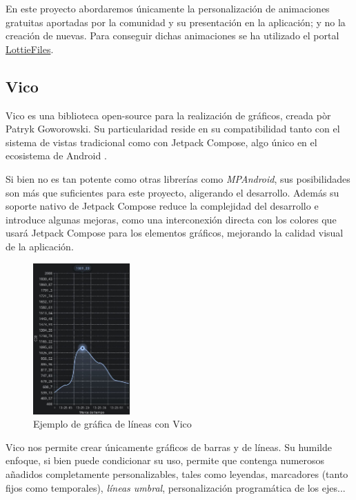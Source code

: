             En este proyecto abordaremos únicamente la personalización de animaciones gratuitas aportadas por la 
            comunidad y su presentación en la aplicación; y no la creación de nuevas. Para conseguir dichas animaciones
            se ha utilizado el portal \href{https://lottiefiles.com/}{LottieFiles}.

        \subsection{Vico}
            
            Vico es una biblioteca open-source para la realización de gráficos, creada pòr Patryk Goworowski. Su 
            particularidad reside en su compatibilidad tanto con el sistema de vistas tradicional como con Jetpack
            Compose, algo único en el ecosistema de Android \cite{goworowski_vico_nodate}.

            Si bien no es tan potente como otras librerías como \textit{MPAndroid}, sus posibilidades son más que 
            suficientes para este proyecto, aligerando el desarrollo. Además su soporte nativo de Jetpack
            Compose reduce la complejidad del desarrollo e introduce algunas mejoras, como una interconexión
            directa con los colores que usará Jetpack Compose para los elementos gráficos, mejorando la calidad visual
            de la aplicación.

            \begin{figure}[h]
                \centering
                \includegraphics[width=0.33\textwidth]{figures/Gráfica de líneas con vico.jpg}
                \caption{Ejemplo de gráfica de líneas con Vico}
                \label{figure:vico:ejemplo_lineas}
            \end{figure}

            Vico nos permite crear únicamente gráficos de barras y de líneas. Su humilde enfoque, si bien puede
            condicionar su uso, permite que contenga numerosos añadidos completamente personalizables, tales como
            leyendas, marcadores (tanto fijos como temporales), \textit{líneas umbral}, personalización programática 
            de los ejes...

